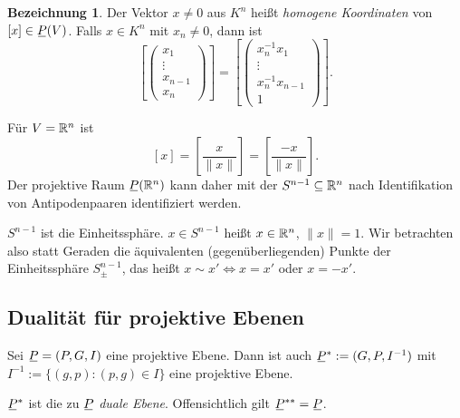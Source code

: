 \documentclass[
 a4paper,
 12pt,
 parskip=half
 ]{scrartcl}
\theoremstyle{plain}
\theoremstyle{definition}
\newtheorem*{deno*}{Bezeichnung}
\begin{document}
\begin{deno*}
 Der Vektor $x \ne 0$ aus $K^n$ heißt \emph{homogene Koordinaten} von $[x] \in \proj(V)$. Falls $x \in K^n$ mit $x_n \ne 0$, dann ist
 \[ \left[ \begin{pmatrix} x_1 \\ \vdots \\ x_{n-1} \\ x_n \end{pmatrix} \right] =
    \left[ \begin{pmatrix} x_n^{-1} x_1 \\ \vdots \\ x_n^{-1} x_{n-1} \\ 1 \end{pmatrix} \right]. \]
\end{deno*}

Für $V = \mathbb{R}^n$ ist
\[ [x] = \left[ \frac{x}{\|x\|} \right] = \left[ \frac{-x}{\|x\|} \right]. \]
Der projektive Raum $\proj(\real^n)$ kann daher mit der $S^{n-1} \subseteq \mathbb{R}^n$ nach Identifikation von Antipodenpaaren identifiziert werden.
 
$S^{n-1}$ ist die Einheitssphäre. $x \in S^{n-1}$ heißt $x \in \mathbb{R}^n$, $\| x \| = 1$. Wir betrachten also statt Geraden die äquivalenten (gegenüberliegenden) Punkte der Einheitssphäre $S^{n-1}_\pm$, das heißt $x \sim x' \Leftrightarrow x = x'$ oder $x = -x'$.

\subsection{Dualität für projektive Ebenen}
\begin{thm}
 Sei $\proj = (P,G,I)$ eine projektive Ebene. Dann ist auch $\proj^* := (G,P,I^{-1})$ mit $I^{-1} := \{ (g,p) : (p,g) \in I \}$ eine projektive Ebene.
\end{thm}

$\proj^*$ ist die zu $\proj$ \emph{duale Ebene}. Offensichtlich gilt $\proj^{**} = \proj$.
\end{document}

